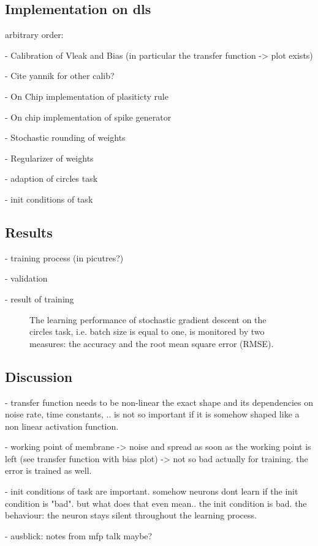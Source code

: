 

\subsection{Implementation on \gls{dls}}

arbitrary order:

- Calibration of Vleak and Bias (in particular the transfer function -> plot exists)

- Cite yannik for other calib?

- On Chip implementation of plasiticty rule

- On chip implementation of spike generator

- Stochastic rounding of weights

- Regularizer of weights

- adaption of circles task 

- init conditions of task


\subsection{Results}

- training process (in picutres?)

- validation

- result of training

\begin{figure}
	\label{circles_acc}
	\begin{center}
		
	\end{center}
	\caption{The learning performance of stochastic gradient descent on the circles task, i.e. batch size is equal to one, is monitored by two measures: the accuracy and the root mean square error (RMSE).}
\end{figure}
\subsection{Discussion}

- transfer function needs to be non-linear the exact shape and its dependencies on noise rate, time constants, .. is not so important if it is somehow shaped like a non linear activation function.

- working point of membrane -> noise and spread as soon as the working point is left (see transfer function with bias plot) -> not so bad actually for training. the error is trained as well. 

- init conditions of task are important. somehow neurons dont learn if the init condition is "bad". but what does that even  mean.. the init condition is bad. the behaviour: the neuron stays silent throughout the learning process. 

- ausblick: notes from mfp talk maybe?